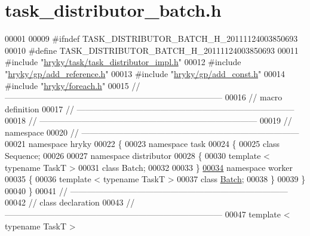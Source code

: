 \hypertarget{task__distributor__batch_8h_source}{\section{task\-\_\-distributor\-\_\-batch.\-h}
}

\begin{DoxyCode}
00001 
00009 \textcolor{preprocessor}{#ifndef TASK\_DISTRIBUTOR\_BATCH\_H\_20111124003850693}
00010 \textcolor{preprocessor}{}\textcolor{preprocessor}{#define TASK\_DISTRIBUTOR\_BATCH\_H\_20111124003850693}
00011 \textcolor{preprocessor}{}\textcolor{preprocessor}{#include "\hyperlink{task__distributor__impl_8h}{hryky/task/task_distributor_impl.h}"}
00012 \textcolor{preprocessor}{#include "\hyperlink{add__reference_8h}{hryky/gp/add_reference.h}"}
00013 \textcolor{preprocessor}{#include "\hyperlink{add__const_8h}{hryky/gp/add_const.h}"}
00014 \textcolor{preprocessor}{#include "\hyperlink{foreach_8h}{hryky/foreach.h}"}
00015 \textcolor{comment}{//
      ------------------------------------------------------------------------------}
00016 \textcolor{comment}{// macro definition}
00017 \textcolor{comment}{//
      ------------------------------------------------------------------------------}
00018 \textcolor{comment}{//
      ------------------------------------------------------------------------------}
00019 \textcolor{comment}{// namespace}
00020 \textcolor{comment}{//
      ------------------------------------------------------------------------------}
00021 \textcolor{keyword}{namespace }hryky
00022 \{
00023 \textcolor{keyword}{namespace }task
00024 \{
00025     \textcolor{keyword}{class }Sequence;
00026     
00027 \textcolor{keyword}{namespace }distributor
00028 \{
00030     \textcolor{keyword}{template} < \textcolor{keyword}{typename} TaskT >
00031     \textcolor{keyword}{class }Batch;
00032 
00033 \}
\hypertarget{task__distributor__batch_8h_source_l00034}{}\hyperlink{namespacehryky_1_1task_1_1worker}{00034} \textcolor{keyword}{namespace }worker
00035 \{
00036     \textcolor{keyword}{template} < \textcolor{keyword}{typename} TaskT >
00037     \textcolor{keyword}{class }\hyperlink{classhryky_1_1task_1_1worker_1_1_batch}{Batch};
00038 \}
00039 \}
00040 \}
00041 \textcolor{comment}{//
      ------------------------------------------------------------------------------}
00042 \textcolor{comment}{// class declaration}
00043 \textcolor{comment}{//
      ------------------------------------------------------------------------------}
00047 \textcolor{comment}{}\textcolor{keyword}{template} < \textcolor{keyword}{typename} TaskT >

\end{DoxyCode}
